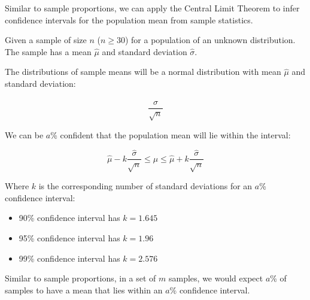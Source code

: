 \documentclass[a4paper,11pt]{report}
\begin{document}
Similar to sample proportions, we can apply the Central Limit Theorem to infer
confidence intervals for the population mean from sample statistics.

Given a sample of size $n$ ($n \geq 30$) for a population of an unknown
distribution. The sample has a mean $\hat{\mu}$ and standard deviation
$\hat{\sigma}$.

The distributions of sample means will be a normal distribution with mean
$\hat{\mu}$ and standard deviation:

$$
\frac{\hat{\sigma}}{\sqrt{n}}
$$

We can be $a$\% confident that the population mean will lie within the interval:

$$
\hat{\mu} - k \frac{\hat{\sigma}}{\sqrt{n}} \leq \mu \leq \hat{\mu} + k \frac{\hat{\sigma}}{\sqrt{n}}
$$

Where $k$ is the corresponding number of standard deviations for an $a$\%
confidence interval:

\begin{itemize}
\item 90\% confidence interval has $k = 1.645$
\item 95\% confidence interval has $k = 1.96$
\item 99\% confidence interval has $k = 2.576$
\end{itemize}

Similar to sample proportions, in a set of $m$ samples, we would expect $a$\%
of samples to have a mean that lies within an $a$\% confidence interval.
\end{document}

